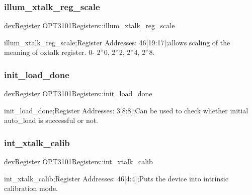 \subsubsection{\texorpdfstring{illum\+\_\+xtalk\+\_\+reg\+\_\+scale}{illum\_xtalk\_reg\_scale}}
{\footnotesize\ttfamily \mbox{\hyperlink{classdev_register}{dev\+Register}} O\+P\+T3101\+Registers\+::illum\+\_\+xtalk\+\_\+reg\+\_\+scale}



illum\+\_\+xtalk\+\_\+reg\+\_\+scale;Register Addresses\+: 46\mbox{[}19\+:17\mbox{]};allows scaling of the meaning of oxtalk register. 0-\/ 2$^\wedge$0, 2$^\wedge$2, 2$^\wedge$4, 2$^\wedge$8. 

\mbox{\label{class_o_p_t3101_registers_a6e5ead741220099cce07cf99c64b958d}} 
\subsubsection{\texorpdfstring{init\+\_\+load\+\_\+done}{init\_load\_done}}
{\footnotesize\ttfamily \mbox{\hyperlink{classdev_register}{dev\+Register}} O\+P\+T3101\+Registers\+::init\+\_\+load\+\_\+done}



init\+\_\+load\+\_\+done;Register Addresses\+: 3\mbox{[}8\+:8\mbox{]};Can be used to check whether initial auto\+\_\+load is successful or not. 

\mbox{\label{class_o_p_t3101_registers_a3b6ac9de3bd76e59cecdf40d5d29d452}} 
\subsubsection{\texorpdfstring{int\+\_\+xtalk\+\_\+calib}{int\_xtalk\_calib}}
{\footnotesize\ttfamily \mbox{\hyperlink{classdev_register}{dev\+Register}} O\+P\+T3101\+Registers\+::int\+\_\+xtalk\+\_\+calib}



int\+\_\+xtalk\+\_\+calib;Register Addresses\+: 46\mbox{[}4\+:4\mbox{]};Puts the device into intrinsic calibration mode. 

